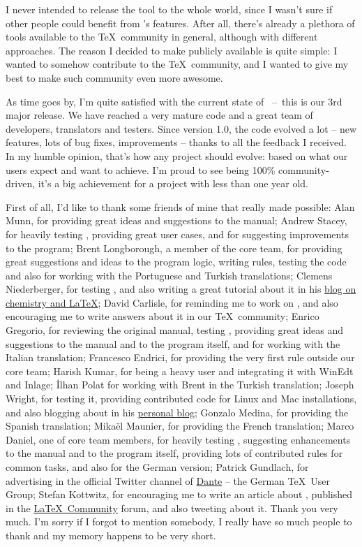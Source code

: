 \documentclass[a4paper,twoside,12pt]{memoir}
\begin{document}
I never intended to release the tool to the whole world, since I wasn't sure if other people could benefit from
\arara's features. After all, there's already a plethora of tools available to the \TeX\ community in general,
although with different approaches. The reason I decided to make \arara publicly available is quite simple:
I wanted to somehow contribute to the \TeX\ community, and I wanted to give my best to make such
community even more awesome.

As time goes by, I'm quite satisfied with the current state of \arara~--~this is our 3rd major release. We
have reached a very mature code and a great team of developers, translators and testers. Since version 1.0,
the code evolved a lot -- new features, lots of bug fixes, improvements -- thanks to all the feedback I
received. In my humble opinion, that's how any project should evolve: based on what our users expect and
want to achieve. I'm proud to see \arara being 100\% community-driven, it's a big achievement for a project
with less than one year old.

First of all, I'd like to thank some friends of mine that really made \arara possible: Alan Munn, for providing
great ideas and suggestions to the manual; Andrew Stacey, for heavily testing \arara, providing great user
cases, and for suggesting improvements to the program; Brent Longborough, a member of the core team,
for providing great suggestions and ideas to the program logic, writing rules, testing the code and also for
working with the Portuguese and Turkish translations; Clemens Niederberger, for testing \arara, and also
writing a great tutorial about it in his
\href{http://www.mychemistry.eu/2012/06/arara-automate-latex-birds-music/}{blog on chemistry and \LaTeX};
David Carlisle, for reminding me to work on \arara, and also encouraging me to write answers about it in
our \TeX\ community; Enrico Gregorio, for reviewing the original manual, testing \arara, providing great
ideas and suggestions to the manual and to the program itself, and for working with the Italian translation;
Francesco Endrici, for providing the very first \arara rule outside our core team; Harish Kumar, for being a
heavy \arara user and integrating it with WinEdt and Inlage; \.Ilhan Polat for working with Brent in the Turkish
translation; Joseph Wright, for testing it, providing contributed code for Linux and Mac installations, and also
blogging about \arara in his \href{http://www.texdev.net}{personal blog}; Gonzalo Medina, for providing the
Spanish translation; Mikaël Maunier, for providing the French translation; Marco Daniel, one of core team
members, for heavily testing \arara, suggesting enhancements to the manual and to the program itself,
providing lots of contributed rules for common tasks, and also for the German version; Patrick Gundlach,
for advertising \arara in the official Twitter channel of \href{http://www.dante.de}{Dante} -- the German
\TeX\ User Group; Stefan Kottwitz, for encouraging me to write an article about \arara, published in the
\href{http://latex-community.org/know-how/435-gnuplot-arara}{\LaTeX\ Community} forum, and also
tweeting about it. Thank you very much. I'm sorry if I forgot to mention somebody, I really have so much
people to thank and my memory happens to be very short.
\end{document}
